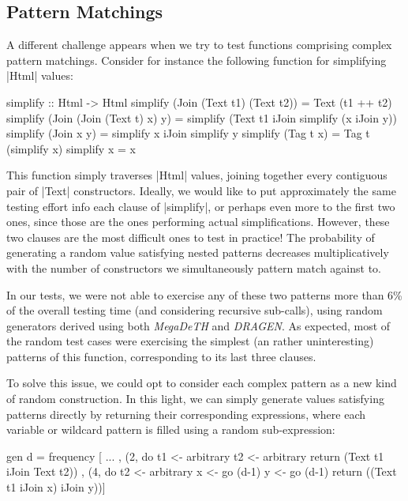 %
\subsection{Pattern Matchings}

A different challenge appears when we try to test functions comprising complex
pattern matchings. Consider for instance the following function for simplifying
|Html| values:

\begin{code}
simplify :: Html -> Html
simplify (Join (Text t1) (Text t2)) = Text (t1 ++ t2)
simplify (Join (Join (Text t) x) y)
  = simplify (Text t1 iJoin simplify (x iJoin y))
simplify (Join x y) = simplify x iJoin simplify y
simplify (Tag t x) = Tag t (simplify x)
simplify x = x
\end{code}
%
This function simply traverses |Html| values, joining together every contiguous
pair of |Text| constructors.
%
Ideally, we would like to put approximately the same testing effort info each
clause of |simplify|, or perhaps even more to the first two ones, since those
are the ones performing actual simplifications.
%
However, these two clauses are the most difficult ones to test in practice!
%
The probability of generating a random value satisfying nested patterns
decreases multiplicatively with the number of constructors we simultaneously
pattern match against to.


In our tests, we were not able to exercise any of these two patterns more than
6\% of the overall testing time (and considering recursive sub-calls), using
random generators derived using both \emph{MegaDeTH} and \emph{DRAGEN}.
%
As expected, most of the random test cases were exercising the simplest (an
rather uninteresting) patterns of this function, corresponding to its last three
clauses.


To solve this issue, we could opt to consider each complex pattern as a new kind
of random construction.
%
In this light, we can simply generate values satisfying patterns directly by
returning their corresponding expressions, where each variable or wildcard
pattern is filled using a random sub-expression:

\begin{code}
  gen d = frequency
    [ ...
    , (2, do  t1  <- arbitrary
              t2  <- arbitrary
              return (Text t1 iJoin Text t2))
    , (4, do  t2  <- arbitrary
              x   <- go (d-1)
              y   <- go (d-1)
              return ((Text t1 iJoin x) iJoin y))]
\end{code}%


